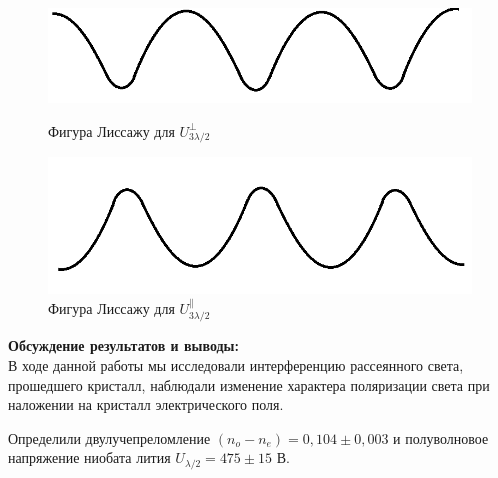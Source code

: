 \documentclass[a4paper, 12pt]{article}%
\begin{document}
\begin{enumerate}
	\begin{figure}[H]
		\centering
		\begin{minipage}[b]{0.45\textwidth}
			\includegraphics[width=\textwidth]{perp3-2.png}
			\caption{Фигура Лиссажу для $U_{3\lambda/2}^{\perp}$}
		\end{minipage}
		\hfill
		\begin{minipage}[b]{0.45\textwidth}
			\includegraphics[width=\textwidth]{parall3-2.png}
			\caption{Фигура Лиссажу для $U_{3\lambda/2}^{\parallel}$}
		\end{minipage}
	\end{figure}
	
	\end{enumerate}
	
	\textbf{Обсуждение результатов и выводы: }\\
	
	В ходе данной работы мы исследовали интерференцию рассеянного света,
	прошедшего кристалл, наблюдали изменение характера поляризации света при наложении на кристалл электрического поля.
	
	Определили двулучепреломление $(n_o - n_e) =  0,104 \pm 0,003$ и  полуволновое напряжение  ниобата лития $U_{\lambda/2} = 475 \pm 15$ В. 
	
	
	
\end{document}
